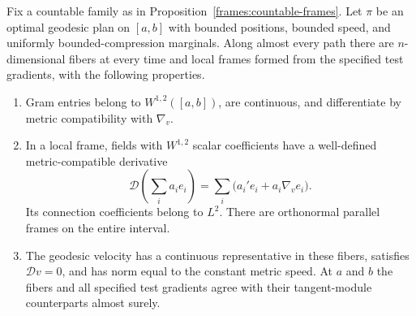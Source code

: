 \begin{proposition}
 \label{frames:path-calculus}
 Fix a countable family as in Proposition~\ref{frames:countable-frames}.
 Let $\pi$ be an optimal geodesic plan on $[a,b]$ with bounded
 positions, bounded speed, and uniformly bounded-compression
 marginals.  Along almost every path there are $n$-dimensional
 fibers at every time and local frames formed from the specified
 test gradients, with the following properties.
 \begin{enumerate}
  \item Gram entries belong to $W^{1,2}([a,b])$, are continuous,
  and differentiate by metric compatibility with $\nabla_v$.
  \item In a local frame, fields with $W^{1,2}$ scalar
  coefficients have a well-defined metric-compatible derivative
  \begin{equation}\label{frames:curve-derivative}
   \mathcal D\left(\sum_i a_i e_i\right)
        =\sum_i\bigl(a_i'e_i+a_i\nabla_v e_i\bigr).
  \end{equation}
  Its connection coefficients belong to $L^2$.
  There are orthonormal parallel frames on the entire interval.
  \item The geodesic velocity has a continuous representative in
  these fibers, satisfies $\mathcal Dv=0$, and has norm equal to
  the constant metric speed.  At $a$ and $b$ the fibers and all
  specified test gradients agree with their tangent-module
  counterparts almost surely.
 \end{enumerate}
\end{proposition}

